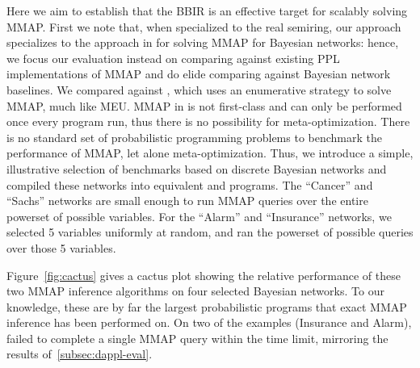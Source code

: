 Here we aim to establish that the BBIR
is an effective target for scalably solving MMAP. First we note that, when specialized
to the real semiring, our approach specializes to the
approach in \citet{huang2006solving} for solving MMAP for Bayesian networks:
hence, we focus our evaluation instead on comparing against existing PPL implementations of MMAP and do elide comparing against Bayesian network baselines.
We compared \pineappl{} against
\problog{}, which uses an
enumerative strategy to solve MMAP, much like MEU.
MMAP in \problog{} is not first-class and can only be performed once every
program run, thus there is no possibility for meta-optimization.
There is no standard set of probabilistic programming problems to
benchmark the performance of MMAP, let alone meta-optimization.
Thus, we introduce a simple, illustrative
selection of benchmarks based on discrete Bayesian networks and compiled these
networks into equivalent \pineappl{} and \problog{} programs. The ``Cancer'' and ``Sachs''
networks are small enough to run MMAP queries over the entire powerset of
possible variables. For the ``Alarm'' and ``Insurance'' networks, we selected 5
variables uniformly at random, and ran the powerset of possible queries over
those 5 variables.

Figure~\ref{fig:cactus} gives a cactus plot showing the
relative performance of these two MMAP inference algorithms on four selected
Bayesian networks. To our
knowledge, these are by far the largest probabilistic programs that exact MMAP
inference has been performed on. On two of the examples (Insurance and Alarm),
\problog{} failed to complete a single MMAP query within the time limit,
mirroring the results of~\cref{subsec:dappl-eval}.

